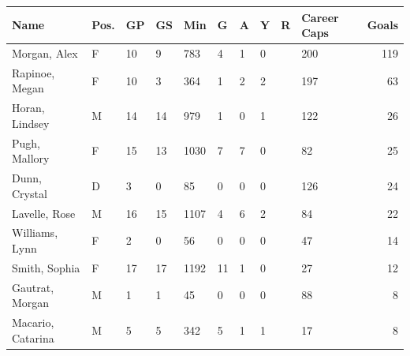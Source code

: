 \documentclass[
  11pt,
]{book}
\newenvironment{Shaded}{\begin{snugshade}}{\end{snugshade}}
\newcommand{\AttributeTok}[1]{\textcolor[rgb]{0.77,0.63,0.00}{#1}}
\newcommand{\DecValTok}[1]{\textcolor[rgb]{0.00,0.00,0.81}{#1}}
\newcommand{\FunctionTok}[1]{\textcolor[rgb]{0.00,0.00,0.00}{#1}}
\newcommand{\NormalTok}[1]{#1}
\newcommand{\OtherTok}[1]{\textcolor[rgb]{0.56,0.35,0.01}{#1}}
\newcommand{\SpecialCharTok}[1]{\textcolor[rgb]{0.00,0.00,0.00}{#1}}
\newcommand{\StringTok}[1]{\textcolor[rgb]{0.31,0.60,0.02}{#1}}
\theoremstyle{definition}
\theoremstyle{definition}
\theoremstyle{definition}
\theoremstyle{definition}
\theoremstyle{remark}
\begin{document}
\begin{Shaded}
\end{Shaded}

\begin{tabular}{llllllllllr}
\toprule
Name & Pos. & GP & GS & Min & G & A & Y & R & Career Caps & Goals\\
\midrule
Morgan, Alex & F & 10 & 9 & 783 & 4 & 1 & 0 &  & 200 & 119\\
Rapinoe, Megan & F & 10 & 3 & 364 & 1 & 2 & 2 &  & 197 & 63\\
Horan, Lindsey & M & 14 & 14 & 979 & 1 & 0 & 1 &  & 122 & 26\\
Pugh, Mallory & F & 15 & 13 & 1030 & 7 & 7 & 0 &  & 82 & 25\\
Dunn, Crystal & D & 3 & 0 & 85 & 0 & 0 & 0 &  & 126 & 24\\
\addlinespace
Lavelle, Rose & M & 16 & 15 & 1107 & 4 & 6 & 2 &  & 84 & 22\\
Williams, Lynn & F & 2 & 0 & 56 & 0 & 0 & 0 &  & 47 & 14\\
Smith, Sophia & F & 17 & 17 & 1192 & 11 & 1 & 0 &  & 27 & 12\\
Gautrat, Morgan & M & 1 & 1 & 45 & 0 & 0 & 0 &  & 88 & 8\\
Macario, Catarina & M & 5 & 5 & 342 & 5 & 1 & 1 &  & 17 & 8\\
\bottomrule
\end{tabular}
\end{document}
